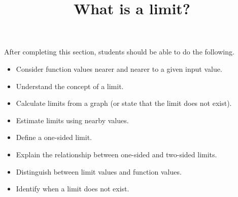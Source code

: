 \documentclass{ximera}
\title{What is a limit?}
\begin{document}
\begin{abstract}
\end{abstract}

\maketitle

After completing this section, students should be able to do the following.

\begin{itemize}
	\item Consider function values nearer and nearer to a given input value.
	\item Understand the concept of a limit.
	\item Calculate limits from a graph (or state that the limit does not exist).
	\item Estimate limits using nearby values.
	\item Define a one-sided limit.
	\item Explain the relationship between one-sided and two-sided limits.
	\item Distinguish between limit values and function values.
	\item Identify when a limit does not exist.
\end{itemize}
\end{document}
